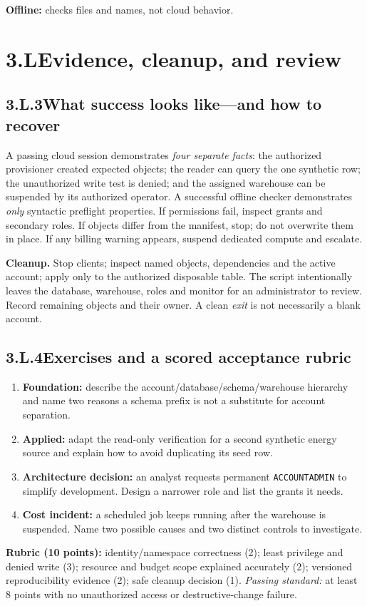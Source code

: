\documentclass[11pt,twoside]{article}
\newcommand{\topic}[2]{\subsection*{#1\quad #2}}
\begin{document}
\textbf{Offline:}  checks files and names, not cloud behavior.

\newpage
\section*{3.L\quad Evidence, cleanup, and review}
\topic{3.L.3}{What success looks like---and how to recover}
A passing cloud session demonstrates \emph{four separate facts}: the authorized provisioner created expected objects; the reader can query the one synthetic row; the unauthorized write test is denied; and the assigned warehouse can be suspended by its authorized operator. A successful offline checker demonstrates \emph{only} syntactic preflight properties. If permissions fail, inspect grants and secondary roles. If objects differ from the manifest, stop; do not overwrite them in place. If any billing warning appears, suspend dedicated compute and escalate.

\textbf{Cleanup.} Stop clients; inspect named objects, dependencies and the active account; apply  only to the authorized disposable table. The script intentionally leaves the database, warehouse, roles and monitor for an administrator to review. Record remaining objects and their owner. A clean \emph{exit} is not necessarily a blank account.

\topic{3.L.4}{Exercises and a scored acceptance rubric}
\begin{enumerate}
\item \textbf{Foundation:} describe the account/database/schema/warehouse hierarchy and name two reasons a schema prefix is not a substitute for account separation.
\item \textbf{Applied:} adapt the read-only verification for a second synthetic energy source and explain how to avoid duplicating its seed row.
\item \textbf{Architecture decision:} an analyst requests permanent \texttt{ACCOUNTADMIN} to simplify development. Design a narrower role and list the grants it needs.
\item \textbf{Cost incident:} a scheduled job keeps running after the warehouse is suspended. Name two possible causes and two distinct controls to investigate.
\end{enumerate}
\textbf{Rubric (10 points):} identity/namespace correctness (2); least privilege and denied write (3); resource and budget scope explained accurately (2); versioned reproducibility evidence (2); safe cleanup decision (1). \emph{Passing standard:} at least 8 points with no unauthorized access or destructive-change failure.
\end{document}
